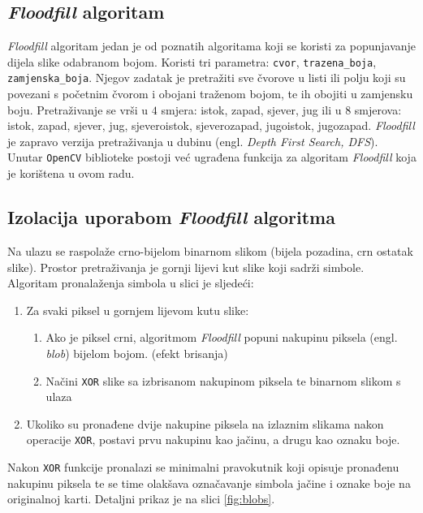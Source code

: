 \documentclass[times, zavrsni, numeric, utf8]{fer}
\newcommand{\code}[1]{\texttt{#1}}
\begin{document}
\subsection{\textit{Floodfill} algoritam}
\label{schap:floodfill}
\hspace*{0.5cm}\textit{Floodfill} algoritam jedan je od poznatih algoritama koji se koristi za popunjavanje dijela slike odabranom bojom. Koristi tri parametra: \code{cvor}, \code{trazena_boja}, \code{zamjenska_boja}. Njegov zadatak je pretražiti sve čvorove u listi ili polju koji su povezani s početnim čvorom i obojani traženom bojom, te ih obojiti u zamjensku boju. Pretraživanje se vrši u $4$ smjera: istok, zapad, sjever, jug ili u $8$ smjerova: istok, zapad, sjever, jug, sjeveroistok, sjeverozapad, jugoistok, jugozapad. \textit{Floodfill} je zapravo verzija pretraživanja u dubinu (engl. \textit{Depth First Search, DFS}). Unutar \code{OpenCV} biblioteke postoji već ugrađena funkcija za algoritam \textit{Floodfill} koja je korištena u ovom radu. %

\subsection{Izolacija uporabom \textit{Floodfill} algoritma}
\label{schap:ffiso}
\hspace*{0.5cm}Na ulazu se raspolaže crno-bijelom binarnom slikom (bijela pozadina, crn ostatak slike). Prostor pretraživanja je gornji lijevi kut slike koji sadrži simbole. Algoritam pronalaženja simbola u slici je sljedeći:
\begin{enumerate}
  \item Za svaki piksel u gornjem lijevom kutu slike:
  \begin{enumerate}
    \item Ako je piksel crni, algoritmom \textit{Floodfill} popuni nakupinu piksela (engl. \textit{blob}) bijelom bojom. (efekt brisanja)
    \item Načini \code{XOR} slike sa izbrisanom nakupinom piksela te binarnom slikom s ulaza
  \end{enumerate}
  \item Ukoliko su pronađene dvije nakupine piksela na izlaznim slikama nakon operacije \code{XOR}, postavi prvu nakupinu kao jačinu, a drugu kao oznaku boje.
\end{enumerate}

Nakon \code{XOR} funkcije pronalazi se minimalni pravokutnik koji opisuje pronađenu nakupinu piksela te se time olakšava označavanje simbola jačine i oznake boje na originalnoj karti. Detaljni prikaz je na slici \ref{fig:blobs}.
\end{document}

